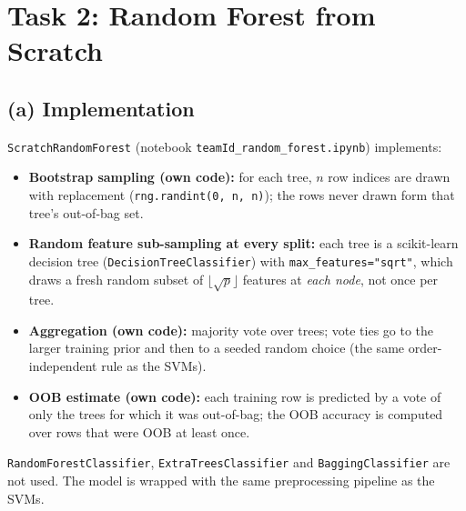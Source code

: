 \documentclass[11pt]{article}
\begin{document}
\section{Task 2: Random Forest from Scratch}
\subsection{(a) Implementation}
\texttt{ScratchRandomForest} (notebook \texttt{teamId\_random\_forest.ipynb}) implements:
\begin{itemize}
\item \textbf{Bootstrap sampling (own code):} for each tree, $n$ row indices are drawn with replacement
(\texttt{rng.randint(0, n, n)}); the rows never drawn form that tree's out-of-bag set.
\item \textbf{Random feature sub-sampling at every split:} each tree is a scikit-learn decision tree
(\texttt{DecisionTreeClassifier}) with \texttt{max\_features="sqrt"}, which draws a fresh random subset of
$\lfloor\sqrt{p}\rfloor$ features at \emph{each node}, not once per tree.
\item \textbf{Aggregation (own code):} majority vote over trees; vote ties go to the larger training
prior and then to a seeded random choice (the same order-independent rule as the SVMs).
\item \textbf{OOB estimate (own code):} each training row is predicted by a vote of only the trees
for which it was out-of-bag; the OOB accuracy is computed over rows that were OOB at least once.
\end{itemize}
\texttt{RandomForestClassifier}, \texttt{ExtraTreesClassifier} and \texttt{BaggingClassifier} are not
used. The model is wrapped with the same preprocessing pipeline as the SVMs.
\end{document}

